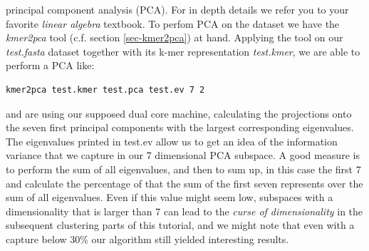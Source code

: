 principal component analysis (PCA). For in depth details we refer you
to your favorite \emph{linear algebra} textbook. To perfom
PCA on the dataset we have the \emph{kmer2pca} tool (c.f. section
\ref{sec-kmer2pca}) at hand. Applying the tool on our 
\emph{test.fasta} dataset together with its k-mer representation
\emph{test.kmer}, we are able to perform a PCA like:
\begin{lstlisting}
kmer2pca test.kmer test.pca test.ev 7 2
\end{lstlisting}
and are using our supposed dual core machine, calculating the
projections onto the seven first principal components with the largest
corresponding eigenvalues. The eigenvalues printed in test.ev allow us
to get an idea of the information variance that we capture in
our 7 dimensional PCA subspace. A good measure is to perform the sum
of all eigenvalues, and then to sum up, in this case the first 7 and
calculate the percentage of that the sum of the first seven represents
over the sum of all eigenvalues. Even if this value might seem low,
subspaces with a dimensionality that is larger than 7 can lead to the
\emph{curse of dimensionality} in the subsequent clustering parts of this
tutorial, and we might note that even with a capture below 30\% our
algorithm still yielded interesting results.

